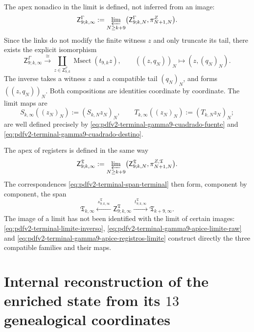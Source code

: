 The apex nonadico in the limit is defined, not inferred from an image:
\begin{equation}
\label{eq:pdfv2-terminal-gamma9-apice-limite-raw}
 \mathsf Z^\Gamma_{9;k,\infty}
 :=\varprojlim_{N\geq k+9}
 \bigl(\mathsf Z^\Gamma_{9;k,N},\pi^Z_{N+1,N}\bigr).
\end{equation}
Since the links do not modify the finite witness \(z\) and only truncate its
tail, there exists the explicit isomorphism
\begin{equation}
\label{eq:pdfv2-terminal-gamma9-apice-limite-msect}
 \mathsf Z^\Gamma_{9;k,\infty}
 \xrightarrow{\ \cong\ }
 \coprod_{z\in\mathsf Z^\Gamma_{9,k}}
 \operatorname{Msect}(t_{9,k}z),\qquad
 ((z,q_N))_N\longmapsto(z,(q_N)_N).
\end{equation}
The inverse takes a witness \(z\) and a compatible tail \((q_N)_N\), and forms
\(((z,q_N))_N\). Both compositions are identities coordinate by
coordinate. The limit maps are
\begin{equation}
\label{eq:pdfv2-terminal-gamma9-mapas-limite-raw}
 S_{k,\infty}((z_N)_N):=(S_{k,N}z_N)_N,\qquad
 T_{k,\infty}((z_N)_N):=(T_{k,N}z_N)_N;
\end{equation}
are well defined precisely by \eqref{eq:pdfv2-terminal-gamma9-cuadrado-fuente} and \eqref{eq:pdfv2-terminal-gamma9-cuadrado-destino}.

The apex of registers is defined in the same way
\begin{equation}
\label{eq:pdfv2-terminal-gamma9-apice-registros-limite}
 \mathsf Z^{\mathfrak T}_{9;k,\infty}
 :=\varprojlim_{N\geq k+9}
 \bigl(\mathsf Z^{\mathfrak T}_{9;k,N},
       \pi^{Z,\mathfrak T}_{N+1,N}\bigr).
\end{equation}
The correspondences
\eqref{eq:pdfv2-terminal-span-terminal} then form, component by
component, the span
\begin{equation}
\label{eq:pdfv2-terminal-span-limite}
 \mathfrak T_{k,\infty}
 \xleftarrow{\ s^{\mathfrak T}_{9;k,\infty}\ }
 \mathsf Z^{\mathfrak T}_{9;k,\infty}
 \xrightarrow{\ t^{\mathfrak T}_{9;k,\infty}\ }
 \mathfrak T_{k+9,\infty}.
\end{equation}
The image of a limit has not been identified with the limit of certain
images: \eqref{eq:pdfv2-terminal-limite-inverso},
\eqref{eq:pdfv2-terminal-gamma9-apice-limite-raw} and
\eqref{eq:pdfv2-terminal-gamma9-apice-registros-limite} construct
directly the three compatible families and their maps.

\section{Internal reconstruction of the enriched state from its \(13\) genealogical coordinates}

